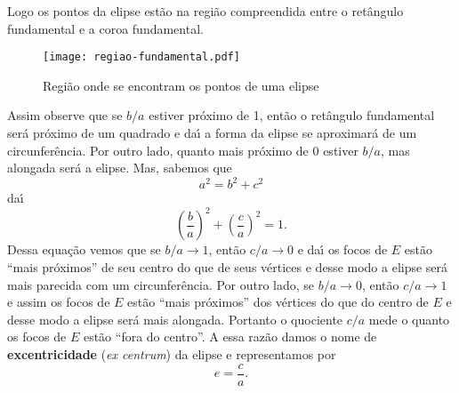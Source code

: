 Logo os pontos da elipse est\~ao na regi\~ao compreendida entre o ret\^angulo fundamental e a coroa fundamental.
\begin{figure}[!h]
  \centering
  \caption{Regi\~ao onde se encontram os pontos de uma elipse}
  \texttt{[image: regiao-fundamental.pdf]}


\end{figure}
Assim observe que se $b/a$ estiver pr\'oximo de 1, ent\~ao o ret\^angulo fundamental ser\'a pr\'oximo de um quadrado e da{\'\i} a forma da elipse se aproximar\'a de um circunfer\^encia. Por outro lado, quanto mais pr\'oximo de 0 estiver $b/a$, mas alongada ser\'a a elipse. Mas, sabemos que
\[
  a^2 = b^2 + c^2
\]
da{\'\i}
\[
  \left(\dfrac{b}{a}\right)^2 + \left(\dfrac{c}{a}\right)^2 = 1.
\]
Dessa equa\c{c}\~ao vemos que se $b/a \to 1$, ent\~ao $c/a \to 0$ e da{\'\i} os focos de $E$ est\~ao ``mais pr\'oximos'' de seu centro do que de seus v\'ertices e desse modo a elipse ser\'a mais parecida com um circunfer\^encia. Por outro lado, se $b/a \to 0$, ent\~ao $c/a \to 1$ e assim os focos de $E$ est\~ao ``mais pr\'oximos'' dos v\'ertices do que do centro de $E$ e desse modo a elipse ser\'a mais alongada.  Portanto o quociente $c/a$ mede o quanto os focos de $E$ est\~ao ``fora do centro''. A essa raz\~ao damos o nome de \textbf{excentricidade} (\textit{ex centrum}) da elipse e representamos por
\[
  e = \dfrac{c}{a}.
\]

